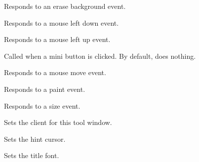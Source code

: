 Responds to an erase background event.


\label{wxtoolwindowonleftdown}


Responds to a mouse left down event.


\label{wxtoolwindowonleftup}


Responds to a mouse left up event.


\label{wxtoolwindowonminibuttonclicked}


Called when a mini button is clicked.
By default, does nothing.


\label{wxtoolwindowonmotion}


Responds to a mouse move event.


\label{wxtoolwindowonpaint}


Responds to a paint event.


\label{wxtoolwindowonsize}


Responds to a size event.


\label{wxtoolwindowsetclient}


Sets the client for this tool window.


\label{wxtoolwindowsethintcursor}


Sets the hint cursor.


\label{wxtoolwindowsettitlefont}


Sets the title font.

